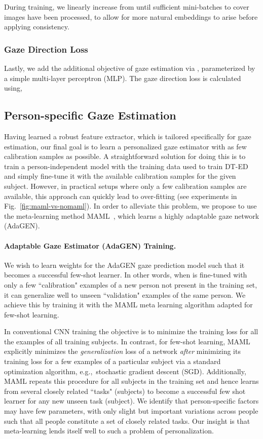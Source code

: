 \documentclass[10pt,twocolumn,letterpaper]{article}
\def\eg{e.g.,~}
\begin{document}
During training, we linearly increase  from  until sufficient mini-batches to cover  images have been processed, to allow for more natural embeddings to arise before applying consistency.



\subsubsection{Gaze Direction Loss}
Lastly, we add the additional objective of gaze estimation via , parameterized by a simple multi-layer perceptron (MLP).
The gaze direction loss is calculated using,


\subsection{Person-specific Gaze Estimation \label{sec:PS-GEN}}
Having learned a robust feature extractor, which is tailored specifically for gaze estimation, our final goal is to learn a personalized gaze estimator 
with as few calibration samples as possible. A straightforward solution for doing this is to train a person-independent model with the training data used to train DT-ED and simply fine-tune it with the available calibration samples for the given subject. However, in practical setups where only a few calibration samples are available, this approach can quickly lead to over-fitting 
(see experiments in Fig.~\ref{fig:maml-vs-nomaml}). In order to alleviate this problem, we propose to use the meta-learning method MAML~\cite{Finn2017ICML}, which learns a highly adaptable gaze network (AdaGEN).


\paragraph{Adaptable Gaze Estimator (AdaGEN) Training.\label{sec:MAML}}
We wish to learn weights  for the AdaGEN gaze prediction model  such that it becomes a  successful few-shot learner. In other words, when  is fine-tuned with only a few ``calibration" examples of a new person  not present in the training set, it can generalize well to unseen ``validation" examples of the same person. We achieve this by training it with the MAML  meta learning algorithm adapted for few-shot learning. 

In conventional CNN training the objective is to minimize the training loss for all the examples of all training subjects. In contrast, for few-shot learning, MAML explicitly minimizes the \emph{generalization} loss of a network \emph{after} minimizing its training loss for a few examples of a particular subject via a standard optimization algorithm, \eg stochastic gradient descent (SGD). Additionally, MAML repeats this procedure for all subjects in the training set and hence learns from several closely related ``tasks" (subjects) to become a successful few shot learner for any new unseen task (subject). We identify that person-specific factors may have few parameters, with only slight but important variations across people such that all people constitute a set of closely related tasks. Our insight is that meta-learning lends itself well to such a problem of personalization.
\end{document}
